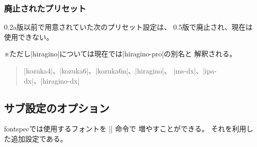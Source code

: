 \documentclass[xelatex,ja=standard,jafont=haranoaji,
  a4paper]{bxjsarticle}
\newcommand{\Pkg}[1]{\textsf{#1}}
\newcommand{\Note}{\par\noindent ※}
\begin{document}
\subsubsection{廃止されたプリセット}

0.2a版以前で用意されていた次のプリセット設定は、
0.5版で廃止され、現在は使用できない。

\Note ただし|hiragino|については現在では|hiragino-pro|の別名と
解釈される。

\begin{quote}
|kozuka4|、|kozuka6|、|kozuka6n|、|hiragino|、
|ms-dx|、|ipa-dx|、|hiragino-dx|
\end{quote}

\subsection{サブ設定のオプション}
\label{ssec:Sub-Option}

\Pkg{fontspec}では使用するフォントを |\newfontfamily| 命令で
増やすことができる。
それを利用した追加設定である。
\end{document}
